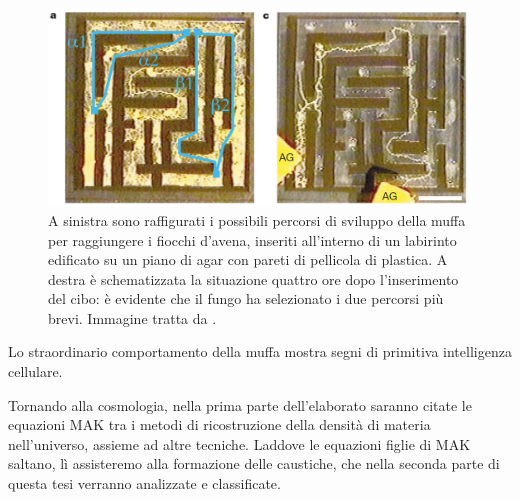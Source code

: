 \begin{center}
	\begin{figure}[H]
		\centering
		\includegraphics[scale=0.3, angle=0]{yamada.png}
		\caption{A sinistra sono raffigurati i possibili percorsi di sviluppo della muffa per raggiungere i fiocchi d'avena, inseriti all'interno 
		di un labirinto edificato su un piano di agar con pareti di pellicola di plastica. A destra	è schematizzata la situazione quattro ore dopo
		l'inserimento del cibo: è evidente che il fungo ha selezionato i due percorsi più brevi. Immagine tratta da \cite{yamada}.}
		\label{fig:yamada}
	\end{figure}
\end{center}
Lo straordinario comportamento della muffa mostra segni di primitiva intelligenza cellulare.

Tornando alla cosmologia, nella prima parte dell'elaborato saranno citate le equazioni MAK tra i metodi di ricostruzione della densità di materia
nell'universo, assieme ad altre tecniche. Laddove le equazioni figlie di MAK saltano, lì assisteremo alla 
formazione delle caustiche, che nella seconda parte di questa tesi verranno analizzate e classificate.